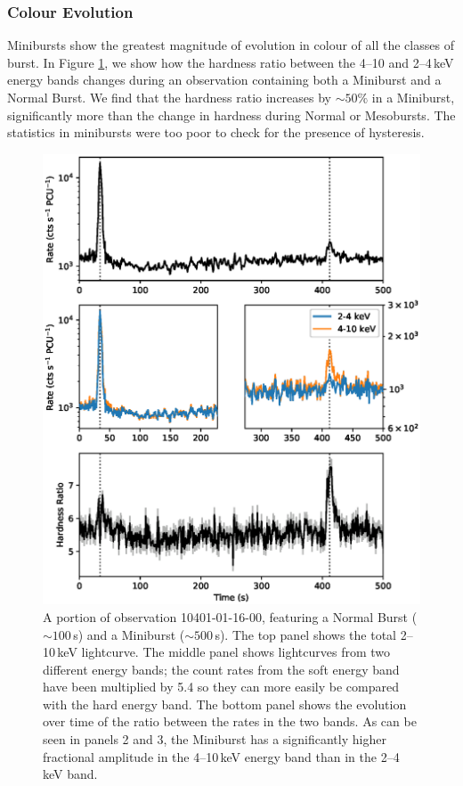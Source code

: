 \subsubsection{Colour Evolution}

\par Minibursts show the greatest magnitude of evolution in colour of all the classes of burst.  In Figure \ref{fig:minihard}, we show how the hardness ratio between the 4--10 and 2--4\,keV energy bands changes during an observation containing both a Miniburst and a Normal Burst.  We find that the hardness ratio increases by $\sim50\%$ in a Miniburst, significantly more than the change in hardness during Normal or Mesobursts.  The statistics in minibursts were too poor to check for the presence of hysteresis.

\begin{figure}
  \centering
  \includegraphics[width=.9\linewidth, trim={0.7cm 1.4cm 0.2cm 1.4cm},clip]{images/hardness_mini.eps}
  \caption{\small A portion of observation 10401-01-16-00, featuring a Normal Burst ($\sim100$\,s) and a Miniburst ($\sim500$\,s).  The top panel shows the total 2--10\,keV lightcurve.  The middle panel shows lightcurves from two different energy bands; the count rates from the soft energy band have been multiplied by 5.4 so they can more easily be compared with the hard energy band.  The bottom panel shows the evolution over time of the ratio between the rates in the two bands.   As can be seen in panels 2 and 3, the Miniburst has a significantly higher fractional amplitude in the 4--10\,keV energy band than in the 2--4\,keV band.}
  \label{fig:minihard}
\end{figure}

